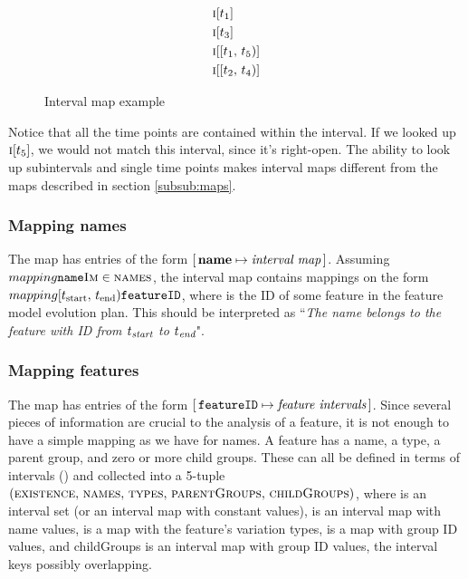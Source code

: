 \begin{figure}[h]
  \begin{align*}
    & \textsc{i}[t_1] \\
    & \textsc{i}[t_3] \\
    & \textsc{i}[[t_1,\, t_5)] \\
    & \textsc{i}[[t_2,\, t_4)]
  \end{align*}
  \caption{Interval map example}
  \label{ex:interval-map}
\end{figure}

Notice that all the time points are contained within the interval. If we looked up $\textsc{i}[t_5]$, we would not match this interval, since it's right-open. The ability to look up subintervals and single time points makes interval maps different from the maps described in section \ref{subsub:maps}. 

\subsubsection{Mapping names}
\label{subsub:mapping-names}

The \names{} map has entries of the form $[\,\textbf{name}{} \mapsto \textit{interval map}\,]$. Assuming $mapping{\texttt{name}}{\textsc{Im}} \in \textsc{names}$, the interval map  contains mappings on the form $mapping{[t_\text{start},\, t_\text{end})}{\texttt{featureID}}$, where  is the ID of some feature in the feature model evolution plan. This should be interpreted as ``\emph{The name \emph{} belongs to the feature with ID \emph{} from $t_{\emph{\text{start}}}$ to $t_{\emph{\text{end}}}$}". 

\subsubsection{Mapping features}
\label{subsub:mapping-features}


The \features{} map has entries of the form $[\,\texttt{featureID} \mapsto \textit{feature intervals}\,]$. Since several pieces of information are crucial to the analysis of a feature, it is not enough to have a simple mapping as we have for names.
A feature has a name, a type, a parent group, and zero or more child groups. 
These can all be defined in terms of intervals () and collected into a 5-tuple $(\textsc{existence},\, \textsc{names},\, \textsc{types},\, \textsc{parentGroups},\, \textsc{childGroups})$, where  is an interval set (or an interval map with constant values),  is an interval map with name values,  is a map with the feature's variation types,  is a map with group ID values, and childGroups is an interval map with group ID values, the interval keys possibly overlapping. 

